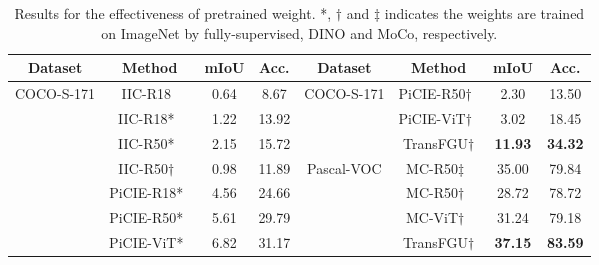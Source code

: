 \documentclass[runningheads]{llncs}
\begin{document}
\begin{table}[h]
    \centering
    \small
    \caption{Results for the effectiveness of pretrained weight. *, $\dag$ and $\ddag$ indicates the weights are trained on ImageNet by fully-supervised, DINO and MoCo, respectively. \label{tab:fair_comparison}}
    \begin{tabular}{cc|cc|cc|cc}
        \toprule
        {Dataset} & {Method} & {mIoU} & {Acc.} & {Dataset} & {Method} & {mIoU} & {Acc.} \tabularnewline
        \midrule
        \multirow{8}{*}{COCO-S-171} & {IIC-R18~\cite{IIC}}      & 0.64  & 8.67  & \multirow{3}{*}{COCO-S-171}   & PiCIE-R50$\dag$~\cite{PiCIE}      & 2.30      & 13.50 \tabularnewline
                                    & {IIC-R18*~\cite{IIC}}     & 1.22  & 13.92 &                               & PiCIE-ViT$\dag$~\cite{PiCIE}      & 3.02      & 18.45 \tabularnewline
                                    & IIC-R50*~\cite{IIC}       & 2.15  & 15.72 &                               & TransFGU$\dag$                    & \bf 11.93 & \bf 34.32 \tabularnewline
        \cline{5-8}                 & IIC-R50$\dag$~\cite{IIC}  & 0.98 & 11.89  & \multirow{4}{*}{Pascal-VOC}   & MC-R50$\ddag$~\cite{MaskContrast} & 35.00     & 79.84 \tabularnewline
                                    & PiCIE-R18*~\cite{PiCIE}   & 4.56 & 24.66  &                               & MC-R50$\dag$~\cite{MaskContrast}  & 28.72     & 78.72\tabularnewline
                                    & PiCIE-R50*~\cite{PiCIE}   & 5.61 & 29.79  &                               & MC-ViT$\dag$~\cite{MaskContrast}  &  31.24    & 79.18\tabularnewline
                                    & PiCIE-ViT*~\cite{PiCIE}   & 6.82 & 31.17  &                               & TransFGU$\dag$                    & \bf 37.15 & \bf 83.59 \tabularnewline
        \bottomrule
    \end{tabular}
\end{table}
\end{document}
